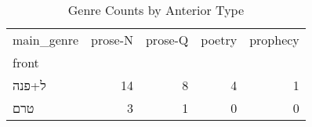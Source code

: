 \begin{table}[htbp!]
\centering
\caption{Genre Counts by Anterior Type}
\label{table:antgenre_ct}
\begin{tabular}{lrrrr}
\toprule
main\_genre &  prose-N &  prose-Q &  poetry &  prophecy \\
front &          &          &         &           \\
\midrule
ל+פנה &       14 &        8 &       4 &         1 \\
טרם   &        3 &        1 &       0 &         0 \\
\bottomrule
\end{tabular}
\end{table}
